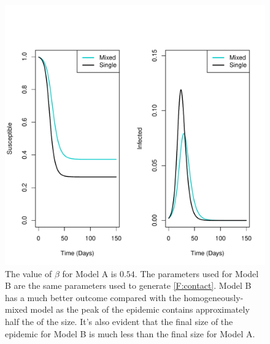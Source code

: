 \documentclass[a4paper, 12pt, journal]{ieeeconf}\usepackage[]{graphicx}\usepackage[]{color}
\begin{document}
\begin{figure}[thpb]
\centering
\includegraphics[scale = 0.44]{figure/R_AB-1.pdf}
\caption{The value of $\beta$ for Model A is $0.54$. The parameters used for Model B are the same parameters used to generate \ref{F:contact}. Model B has a much better outcome compared with the homogeneously-mixed model as the peak of the epidemic contains approximately half the of the size. It's also evident that the final size of the epidemic for Model B is much less than the final size for Model A.}\label{F:Homovshetero}
\end{figure}
\end{document}
